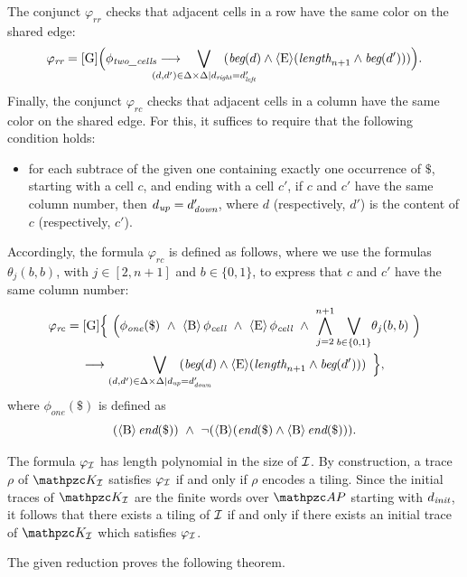 The conjunct $\varphi_{\textit{rr}}$  checks that adjacent cells in a row   have the same color on the shared edge:
\[
\varphi_{\textit{rr}} = \hsGu\Bigl( \phi_{\textit{two\_cells}} \longrightarrow\quad \smashoperator{\bigvee_{(d,d')\in \Delta\times \Delta\mid d_{\Right}= d'_{\Left}}} \quad (\Beg(d) \wedge \hsE(\Length_{n+1}\wedge \Beg(d')))\Bigr ) .
\]
%
Finally, the conjunct   $\varphi_{\textit{rc}}$  checks that adjacent cells in a column  have the same color on the shared edge.
For this, it suffices to require that
the following condition holds:
\begin{itemize}
  \item for each subtrace of the given one containing exactly one occurrence of $\$$, starting with a cell $c$, and ending with a cell $c'$, if $c$ and $c'$ have the same column number, then $d_{\textit{up}}= d'_{\textit{down}}$, where $d$ (respectively, $d'$) is the content of $c$ (respectively, $c'$).
\end{itemize}
%
Accordingly, the formula $\varphi_{\textit{rc}}$ is defined as follows, where we use the formulas $\theta_j(b,b)$, with $j\in [2,n+1]$ and $b\in \{0,1\}$, to express that $c$ and $c'$ have the same column number:
\begin{multline*}
  \varphi_{\textit{rc}} = \hsGu\Bigl\{\,\, \Big(\phi_{\textit{one}}(\$) \,\,\wedge \,\, \hsB\phi_{\textit{cell}} \,\,\wedge \,\, \hsE\phi_{\textit{cell}} \,\,\wedge \,\, \displaystyle{\bigwedge_{j=2}^{n+1}\bigvee_{b\in \{0,1\}}}\theta_j(b,b)\,\,\Bigr)\\
  \longrightarrow \smashoperator[r]{\bigvee_{(d,d')\in \Delta\times \Delta\mid d_{\Up}= d'_{\Down}}}\quad (\Beg(d) \wedge \hsE(\Length_{n+1}\wedge \Beg(d')))\,\,\,\Bigr\},
\end{multline*}
%
where $\phi_{\textit{one}}(\$)$ is defined as
\[
(\operatorname{\langle B\rangle}\textit{end}(\$))\,\,\wedge\,\, \neg(\operatorname{\langle B\rangle}(\textit{end}(\$) \wedge \operatorname{\langle B\rangle}\textit{end}(\$)))
.\]

The formula $\varphi_{\mathcal{I}}$ has length polynomial in the size of $\mathcal{I}$. 
%
By construction, a trace $\rho$ of $\Ku_\Instance$ satisfies $\varphi_{\mathcal{I}}$ if and only if $\rho$ encodes a tiling.
Since the initial traces of $\Ku_\Instance$ are the finite words over $\Prop$ starting with $d_{\textit{init}}$, it follows that there exists a tiling of $\mathcal{I}$ if and only if there exists an initial trace
of $\Ku_\Instance$ which satisfies $\varphi_{\mathcal{I}}$. 

The given reduction proves the following theorem. %

